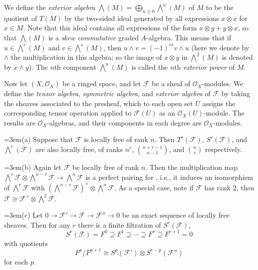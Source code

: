 {We define the \emph{exterior algebra} $\bigwedge(M)=\bigoplus_{n\ge0}\bigwedge^n(M)$ of $M$ to be the quotient of $T(M)$ by the two-sided ideal generated by all expressions $x\otimes x$ for $x\in M$. Note that this ideal contains all expressions of the form $x\otimes y+y\otimes x$, so that $\bigwedge(M)$ is a \emph{skew commutative} graded $A$-algebra. This means that if $u\in\bigwedge^r(M)$ and $v\in\bigwedge^s(M)$, then $u\wedge v=(-1)^{rs}v\wedge u$ (here we denote by $\wedge$ the multiplication in this algebra; so the image of $x\otimes y$ in $\bigwedge^2(M)$ is denoted by $x\wedge y$). The $n$th component $\bigwedge^n(M)$ is called the $n$th \emph{exterior power} of $M$.

Now let $(X,\mathcal O_X)$ be a ringed space, and let $\mathcal F$ be a sheaf of $\mathcal O_X$-modules. We define the \emph{tensor algebra}, \emph{symmetric algebra}, and \emph{exterior algebra} of $\mathcal F$ by taking the sheaves associated to the presheaf, which to each open set $U$ assigns the corresponding tensor operation applied to $\mathcal F(U)$ as an $\mathcal O_X(U)$-module. The results are $\mathcal O_X$-algebras, and their components in each degree are $\mathcal O_X$-modules.

\noindent\hangindent=3em\hspace*{1.7em}(a) Suppose that $\mathcal F$ is locally free of rank $n$. Then $T^r(\mathcal F)$, $S^r(\mathcal F)$, and $\bigwedge^r(\mathcal F)$ are also locally free, of ranks $n^r$, $\binom{n+r-1}{n-1}$, and $\binom nr$ respectively.

\noindent\hangindent=3em\hspace*{1.7em}(b) Again let $\mathcal F$ be locally free of rank $n$. Then the multiplication map $\bigwedge^r\mathcal F\otimes\bigwedge^{n-r}\mathcal F\to\bigwedge^n\mathcal F$ is a perfect pairing for , i.e., it induces an isomorphism of $\bigwedge^r\mathcal F$ with $(\bigwedge^{n-r}\mathcal F)^\vee\otimes\bigwedge^n\mathcal F$. As a special case, note if $\mathcal F$ has rank $2$, then $\mathcal F\cong\mathcal F^\vee\otimes\bigwedge^2\mathcal F$.

\noindent\hangindent=3em\hspace*{1.7em}(c) Let $0\to\mathcal F'\to\mathcal F\to\mathcal F''\to0$ be an exact sequence of locally free sheaves. Then for any $r$ there is a finite filtration of $S^r(\mathcal F)$,
\[
S^r(\mathcal F)=F^0\supseteq F^1\supseteq\cdots\supseteq F^r\supseteq F^{r+1}=0
\]
with quotients
\[
F^p/F^{p+1}\cong S^p(\mathcal F')\otimes S^{r-p}(\mathcal F'')
\]
for each $p$.}
